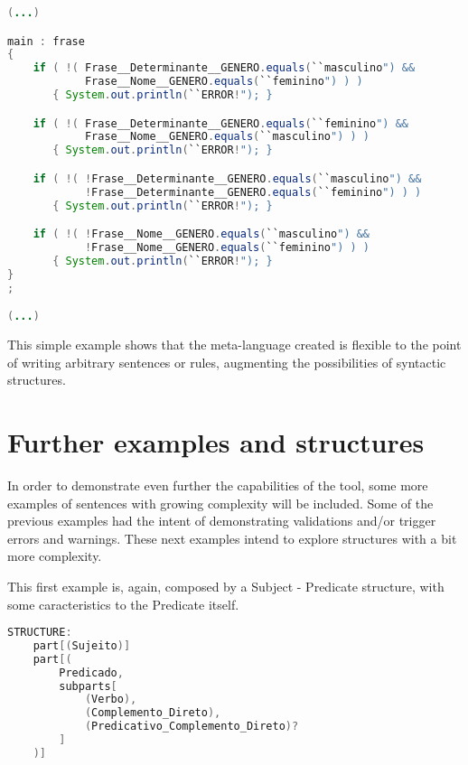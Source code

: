 \begin{center}
\begin{minipage}{10cm}
\begin{lstlisting}[language=java, basicstyle=\tiny, label={lst:case_study_sentence2}, caption=Different conditions from RULES block]
(...)

main : frase
{
    if ( !( Frase__Determinante__GENERO.equals(``masculino") &&
            Frase__Nome__GENERO.equals(``feminino") ) )
       { System.out.println(``ERROR!"); }

    if ( !( Frase__Determinante__GENERO.equals(``feminino") &&
            Frase__Nome__GENERO.equals(``masculino") ) )
       { System.out.println(``ERROR!"); }

    if ( !( !Frase__Determinante__GENERO.equals(``masculino") &&
            !Frase__Determinante__GENERO.equals(``feminino") ) )
       { System.out.println(``ERROR!"); }

    if ( !( !Frase__Nome__GENERO.equals(``masculino") &&
            !Frase__Nome__GENERO.equals(``feminino") ) )
       { System.out.println(``ERROR!"); }
}
;

(...)
\end{lstlisting}
\end{minipage}
\end{center}


This simple example shows that the meta-language created is flexible to the point of writing arbitrary sentences or rules, 
augmenting the possibilities of syntactic structures.

\section{Further examples and structures}

In order to demonstrate even further the capabilities of the tool, some more examples of sentences with growing complexity will be included.
Some of the previous examples had the intent of demonstrating validations and/or trigger errors and warnings.
These next examples intend to explore structures with a bit more complexity.

This first example is, again, composed by a Subject - Predicate structure, with some caracteristics to the Predicate itself.

\begin{center}
\begin{minipage}{14cm}
\begin{lstlisting}[language=java, basicstyle=\small, label={lst:example_structure1}, caption=Example of a sentence structure]
STRUCTURE:
    part[(Sujeito)]
    part[(
        Predicado,
        subparts[
            (Verbo),
            (Complemento_Direto),
            (Predicativo_Complemento_Direto)?
        ]
    )]
\end{lstlisting}
\end{minipage}
\end{center}

